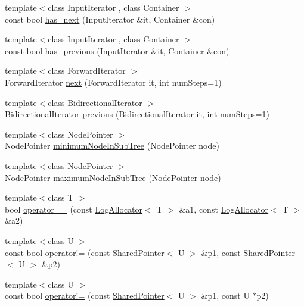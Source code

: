 \begin{DoxyCompactItemize}
\item 
{\footnotesize template$<$class Input\+Iterator , class Container $>$ }\\const bool \hyperlink{namespaceprism_ad56900cb33be6d15ac27a7c61bad2ce6}{has\+\_\+next} (Input\+Iterator \&it, Container \&con)
\item 
{\footnotesize template$<$class Input\+Iterator , class Container $>$ }\\const bool \hyperlink{namespaceprism_af20b814018d65b46e6d08eb450c176c9}{has\+\_\+previous} (Input\+Iterator \&it, Container \&con)
\item 
{\footnotesize template$<$class Forward\+Iterator $>$ }\\Forward\+Iterator \hyperlink{namespaceprism_a16771cef03b7354150e188f4ce10f6b1}{next} (Forward\+Iterator it, int num\+Steps=1)
\item 
{\footnotesize template$<$class Bidirectional\+Iterator $>$ }\\Bidirectional\+Iterator \hyperlink{namespaceprism_a8370841f58d9898247afa42c49a7658d}{previous} (Bidirectional\+Iterator it, int num\+Steps=1)
\item 
{\footnotesize template$<$class Node\+Pointer $>$ }\\Node\+Pointer \hyperlink{namespaceprism_a8aab2862319b55b02ddcb6b9659b3699}{minimum\+Node\+In\+Sub\+Tree} (Node\+Pointer node)
\item 
{\footnotesize template$<$class Node\+Pointer $>$ }\\Node\+Pointer \hyperlink{namespaceprism_a6db5694fde99b39da76f51463f300c4a}{maximum\+Node\+In\+Sub\+Tree} (Node\+Pointer node)
\item 
{\footnotesize template$<$class T $>$ }\\bool \hyperlink{namespaceprism_a7f163cf0ef281768da60b400045aa8d8}{operator==} (const \hyperlink{classprism_1_1_log_allocator}{Log\+Allocator}$<$ T $>$ \&a1, const \hyperlink{classprism_1_1_log_allocator}{Log\+Allocator}$<$ T $>$ \&a2)
\item 
{\footnotesize template$<$class U $>$ }\\const bool \hyperlink{namespaceprism_a9df924e4deb059bf1200701c8235410a}{operator!=} (const \hyperlink{classprism_1_1_shared_pointer}{Shared\+Pointer}$<$ U $>$ \&p1, const \hyperlink{classprism_1_1_shared_pointer}{Shared\+Pointer}$<$ U $>$ \&p2)
\item 
{\footnotesize template$<$class U $>$ }\\const bool \hyperlink{namespaceprism_ad6391c124e006b0e3a3ec67f55e208b0}{operator!=} (const \hyperlink{classprism_1_1_shared_pointer}{Shared\+Pointer}$<$ U $>$ \&p1, const U $\ast$p2)

\end{DoxyCompactItemize}
